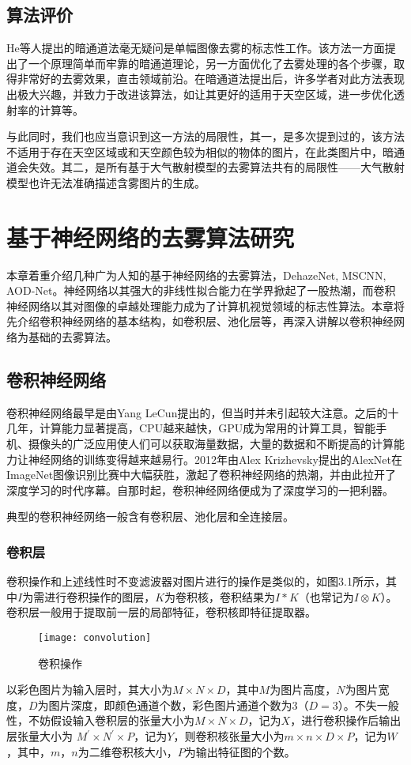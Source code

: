 \documentclass[a4paper, 12pt, oneside]{report}
\begin{document}
{\section{算法评价\quad}
He等人提出的暗通道法毫无疑问是单幅图像去雾的标志性工作。该方法一方面提出了一个原理简单而牢靠的暗通道理论，另一方面优化了去雾处理的各个步骤，取得非常好的去雾效果，直击领域前沿。在暗通道法提出后，许多学者对此方法表现出极大兴趣，并致力于改进该算法，如让其更好的适用于天空区域，进一步优化透射率的计算等。

与此同时，我们也应当意识到这一方法的局限性，其一，是多次提到过的，该方法不适用于存在天空区域或和天空颜色较为相似的物体的图片，在此类图片中，暗通道会失效。其二，是所有基于大气散射模型的去雾算法共有的局限性——大气散射模型也许无法准确描述含雾图片的生成。

\chapter{基于神经网络的去雾算法研究\quad}
本章着重介绍几种广为人知的基于神经网络的去雾算法，DehazeNet, MSCNN, AOD-Net。神经网络以其强大的非线性拟合能力在学界掀起了一股热潮，而卷积神经网络以其对图像的卓越处理能力成为了计算机视觉领域的标志性算法。本章将先介绍卷积神经网络的基本结构，如卷积层、池化层等，再深入讲解以卷积神经网络为基础的去雾算法。

\section{卷积神经网络\quad}
卷积神经网络最早是由Yang LeCun提出的，但当时并未引起较大注意。之后的十几年，计算能力显著提高，CPU越来越快，GPU成为常用的计算工具，智能手机、摄像头的广泛应用使人们可以获取海量数据，大量的数据和不断提高的计算能力让神经网络的训练变得越来越易行。2012年由Alex Krizhevsky提出的AlexNet在ImageNet图像识别比赛中大幅获胜，激起了卷积神经网络的热潮，并由此拉开了深度学习的时代序幕。自那时起，卷积神经网络便成为了深度学习的一把利器。

典型的卷积神经网络一般含有卷积层、池化层和全连接层。

\subsection{卷积层\quad}
卷积操作和上述线性时不变滤波器对图片进行的操作是类似的，{\Large 如图3.1所示}，其中$I$为需进行卷积操作的图层，$K$为卷积核，卷积结果为$I\ast K$（也常记为$I\otimes K$）。卷积层一般用于提取前一层的局部特征，卷积核即特征提取器。
\begin{figure}[H]
\centering
\texttt{[image: convolution]}
\caption{卷积操作}
\end{figure}
以彩色图片为输入层时，其大小为$M \times N \times D$，其中$M$为图片高度，$N$为图片宽度，$D$为图片深度，即颜色通道个数，彩色图片通道个数为3（$D = 3$）。不失一般性，不妨假设输入卷积层的张量大小为$M \times N \times D$，记为$X$，进行卷积操作后输出层张量大小为 $M^{\prime} \times N^{\prime} \times P$，记为$Y$，则卷积核张量大小为$m \times n \times D \times P$，记为$W$，其中，$m$，$n$为二维卷积核大小，$P$为输出特征图的个数。

}
\end{document}
